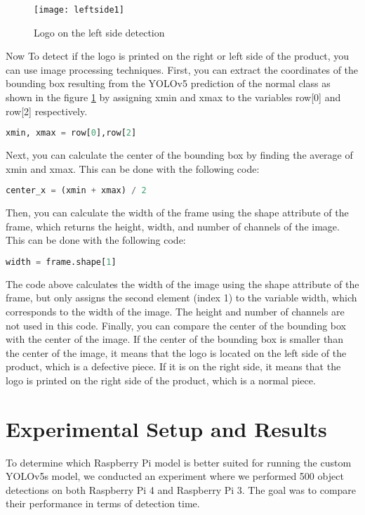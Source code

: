 \begin{itemize}
\begin{figure}[htbp]
        \centering
        \texttt{[image: leftside1]}
        \caption{Logo on the left side detection}
        \label{fig:image4}
\end{figure}
\FloatBarrier
Now To detect if the logo is printed on the right or left side of the product, you can use image processing techniques. First, you can extract the coordinates of the bounding box resulting from the YOLOv5 prediction of the normal class as shown in the figure \ref{fig:image4} by assigning xmin and xmax to the variables row[0] and  row[2] respectively.
\begin{lstlisting}[language=Python]
xmin, xmax = row[0],row[2]
\end{lstlisting}
Next, you can calculate the center of the bounding box by finding the average of xmin and xmax. This can be done with the following code:
\begin{lstlisting}[language=Python]
center_x = (xmin + xmax) / 2
\end{lstlisting}
Then, you can calculate the width of the frame using the shape attribute of the frame, which returns the height, width, and number of channels of the image. This can be done with the following code:
\begin{lstlisting}[language=Python]
width = frame.shape[1]
\end{lstlisting}
The code above  calculates the width of the image using the shape attribute of the frame, but only assigns the second element (index 1) to the variable width, which corresponds to the width of the image. The height and number of channels are not used in this code.
Finally, you can compare the center of the bounding box with the center of the image. If the center of the bounding box is smaller than the center of the image, it means that the logo is located on the left side of the product, which is a defective piece. If it is on the right side, it means that the logo is printed on the right side of the product, which is a normal piece.
\end{itemize}
\section{Experimental Setup and Results}
\label{sec:experimental}

To determine which Raspberry Pi model is better suited for running the custom YOLOv5s model, we conducted an experiment where we performed 500 object detections on both Raspberry Pi 4 and Raspberry Pi 3. The goal was to compare their performance in terms of detection time. 

